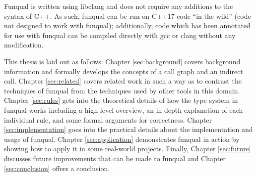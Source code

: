 Funqual is written using libclang and does not require any additions to the syntax of C++.  As such, funqual can be run on C++17 code ``in the wild'' (code not designed to work with funqual);  additionally, code which has been annotated for use with funqual can be compiled directly with gcc or clang without any modification.  

This thesis is laid out as follows:  Chapter \ref{sec:background} covers background information and formally develops the concepts of a call graph and an indirect call.  Chapter \ref{sec:related} covers related work in such a way as to contrast the techniques of funqual from the techniques used by other tools in this domain.  Chapter \ref{sec:rules} gets into the theoretical details of how the type system in funqual works including a high level overview, an in-depth explanation of each individual rule, and some formal arguments for correctness.  Chapter \ref{sec:implementation} goes into the practical details about the implementation and usage of funqual.  Chapter \ref{sec:application} demonstrates funqual in action by showing how to apply it in some real-world projects.  Finally, Chapter \ref{sec:future} discusses future improvements that can be made to funqual and Chapter \ref{sec:conclusion} offers a conclusion.




